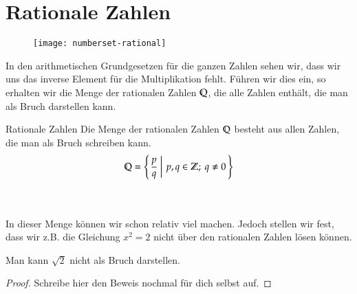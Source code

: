\section{Rationale Zahlen}
\begin{wrapfigure}{r}[1cm]{7cm}
	\vspace{-2cm}
	\texttt{[image: numberset-rational]}
	\vspace{-2cm}
\end{wrapfigure}
In den arithmetischen Grundgesetzen für die ganzen Zahlen sehen wir, dass wir uns das inverse Element für die Multiplikation fehlt.
Führen wir dies ein, so erhalten wir die Menge der rationalen Zahlen $\mathbb{Q}$, die alle Zahlen enthält, die man als Bruch darstellen kann. 
\newpage
\begin{defn}{Rationale Zahlen}
	Die Menge der rationalen Zahlen $\mathbb{Q}$ besteht aus allen Zahlen, die man als Bruch schreiben kann.
	\begin{align*}
		\mathbb{Q} = \left\{\left. \frac{p}{q} ~\right|~ p,q \in \mathbb{Z};~ q \neq 0\, \right\}
	\end{align*}
\end{defn}

~\\~\\
In dieser Menge können wir schon relativ viel machen.
Jedoch stellen wir fest, dass wir z.B. die Gleichung $x^2 = 2$ nicht über den rationalen Zahlen lösen können.

\begin{claim}
 Man kann $\sqrt{2}$ nicht als Bruch darstellen.
\end{claim}

\begin{proof}
 Schreibe hier den Beweis nochmal für dich selbst auf.
 \vfill
\end{proof}





